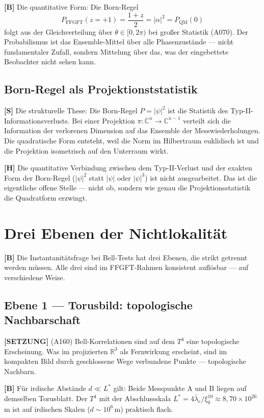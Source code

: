 \textbf{[B]} Die quantitative Form: Die Born-Regel
\[
  P_\text{FFGFT}(z=+1) = \frac{1+z}{2} = |\alpha|^2 = P_\text{QM}(0)
\]
folgt aus der Gleichverteilung über $\theta \in [0,2\pi)$ bei großer
Statistik (A070). Der Probabilismus ist das Ensemble-Mittel über alle
Phasenzustände --- nicht fundamentaler Zufall, sondern Mittelung über
das, was der eingebettete Beobachter nicht sehen kann.

\subsection{Born-Regel als Projektionststatistik}

\textbf{[S]} Die strukturelle These: Die Born-Regel $P = |\psi|^2$ ist
die Statistik des Typ-II-Informationsverlusts. Bei einer Projektion
$\pi: \mathbb{C}^n \to \mathbb{C}^{n-1}$ verteilt sich die Information
der verlorenen Dimension auf das Ensemble der Messwiederholungen.
Die quadratische Form entsteht, weil die Norm im Hilbertraum euklidisch
ist und die Projektion isometrisch auf den Unterraum wirkt.

\textbf{[H]} Die quantitative Verbindung zwischen dem Typ-II-Verlust
und der exakten Form der Born-Regel ($|\psi|^2$ statt $|\psi|$ oder
$|\psi|^3$) ist nicht ausgearbeitet. Das ist die eigentliche offene
Stelle --- nicht ob, sondern wie genau die Projektionsstatistik die
Quadratform erzwingt.

\section{Drei Ebenen der Nichtlokalität}

\textbf{[B]} Die Instantanitätsfrage bei Bell-Tests hat drei Ebenen,
die strikt getrennt werden müssen. Alle drei sind im FFGFT-Rahmen
konsistent auflösbar --- auf verschiedene Weise.

\subsection{Ebene 1 --- Torusbild: topologische Nachbarschaft}

\textbf{[SETZUNG]} (A160) Bell-Korrelationen sind auf dem $T^4$ eine
topologische Erscheinung. Was im projizierten $\mathbb{R}^3$ als
Fernwirkung erscheint, sind im kompakten Bild durch geschlossene Wege
verbundene Punkte --- topologische Nachbarn.

\textbf{[B]} Für irdische Abstände $d \ll L^*$ gilt: Beide Messpunkte
A und B liegen auf demselben Torusblatt. Der $T^4$ mit der
Abschlussskala $L^* = 4\bar\lambda_e/\xi_0^{10} \approx 8{,}70 \times
10^{26}$\,m ist auf irdischen Skalen ($d \sim 10^6$\,m) praktisch flach.

